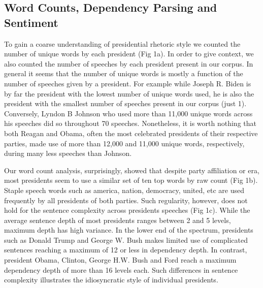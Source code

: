 \documentclass{article}
\begin{document}
{{\subsection{Word Counts, Dependency Parsing and Sentiment}{To gain a coarse understanding of presidential rhetoric style we counted the number of unique words by each president (Fig 1a). In order to give context, we also counted the number of speeches by each president present in our corpus. In general it seems that the number of unique words is mostly a function of the number of speeches given by a president. For example while Joseph R. Biden is by far the president with the lowest number of unique words used, he is also the president with the smallest number of speeches present in our corpus (just 1). Conversely, Lyndon B Johnson who used more than 11,000 unique words across his speeches did so throughout 70 speeches. Nonetheless, it is worth nothing that both Reagan and Obama, often the most celebrated presidents of their respective parties, made use of more than 12,000 and 11,000 unique words, respectively, during many less speeches than Johnson. 

Our word count analysis, surprisingly, showed that despite party affiliation or era, most presidents seem to use a similar set of ten top words by raw count (Fig 1b). Staple speech words such as america, nation, democracy, united, etc are used frequently by all presidents of both parties. Such regularity, however, does not hold for the sentence complexity across presidents speeches (Fig 1c).  While the average sentence depth of most presidents ranges between 2 and 5 levels, maximum depth has high variance. In the lower end of the spectrum, presidents such as Donald Trump and George W. Bush makes limited use of complicated sentences reaching a maximum of 12 or less in dependency depth. In contrast, president Obama, Clinton, George H.W. Bush and Ford reach a maximum dependency depth of more than 16 levels each. Such differences in sentence complexity illustrates the idiosyncratic style of individual presidents.

}}}
\end{document}
